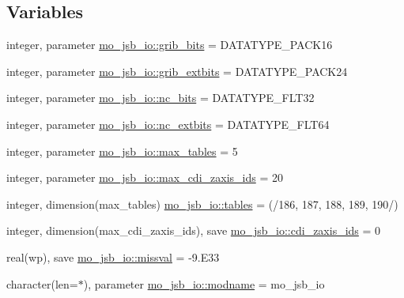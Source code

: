 \subsection*{Variables}
\begin{DoxyCompactItemize}
\item 
integer, parameter \hyperlink{namespacemo__jsb__io_aade09fd070010f905e77497f041ce6c3}{mo\+\_\+jsb\+\_\+io\+::grib\+\_\+bits} = D\+A\+T\+A\+T\+Y\+P\+E\+\_\+\+P\+A\+C\+K16
\item 
integer, parameter \hyperlink{namespacemo__jsb__io_a63d67a0c59ef07ed57100a79ecd9a97f}{mo\+\_\+jsb\+\_\+io\+::grib\+\_\+extbits} = D\+A\+T\+A\+T\+Y\+P\+E\+\_\+\+P\+A\+C\+K24
\item 
integer, parameter \hyperlink{namespacemo__jsb__io_a4bf2b656fa0a7acf938f0bfcad5870e3}{mo\+\_\+jsb\+\_\+io\+::nc\+\_\+bits} = D\+A\+T\+A\+T\+Y\+P\+E\+\_\+\+F\+L\+T32
\item 
integer, parameter \hyperlink{namespacemo__jsb__io_ab5ba0ea9f2dcab7f2a4adf01e662d3c2}{mo\+\_\+jsb\+\_\+io\+::nc\+\_\+extbits} = D\+A\+T\+A\+T\+Y\+P\+E\+\_\+\+F\+L\+T64
\item 
integer, parameter \hyperlink{namespacemo__jsb__io_a7c89ecf533d68304c7e50b8c2f367dd5}{mo\+\_\+jsb\+\_\+io\+::max\+\_\+tables} = 5
\item 
integer, parameter \hyperlink{namespacemo__jsb__io_a5ec7d03d66e8d6e79f41665e227be609}{mo\+\_\+jsb\+\_\+io\+::max\+\_\+cdi\+\_\+zaxis\+\_\+ids} = 20
\item 
integer, dimension(max\+\_\+tables) \hyperlink{namespacemo__jsb__io_aefd9f08b763f8c7b6f4cdbc576e3dd14}{mo\+\_\+jsb\+\_\+io\+::tables} = (/186, 187, 188, 189, 190/)
\item 
integer, dimension(max\+\_\+cdi\+\_\+zaxis\+\_\+ids), save \hyperlink{namespacemo__jsb__io_a40fcb52ae787aaf48e1497bf80759dfb}{mo\+\_\+jsb\+\_\+io\+::cdi\+\_\+zaxis\+\_\+ids} = 0
\item 
real(wp), save \hyperlink{namespacemo__jsb__io_a390ce09c37f32f811fcbc4988d94dec9}{mo\+\_\+jsb\+\_\+io\+::missval} = -\/9.E33
\item 
character(len=$\ast$), parameter \hyperlink{namespacemo__jsb__io_a610da1f729e46e7946c4b868a8f677c2}{mo\+\_\+jsb\+\_\+io\+::modname} = \textquotesingle{}mo\+\_\+jsb\+\_\+io\textquotesingle{}
\end{DoxyCompactItemize}
